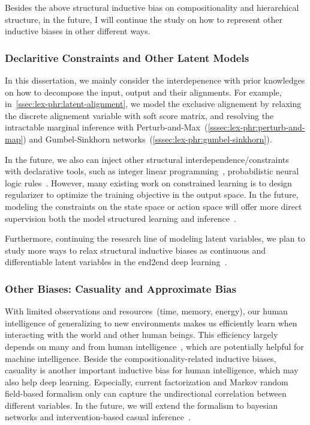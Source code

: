 Besides the above structural inductive bias on compositionality and
hierarchical structure, in the future, I will continue the study on how
to represent other inductive biases in other different ways.

\subsubsection{Declaritive Constraints and Other Latent Models}
\label{sssec:future:constraints}
In this dissertation, we mainly consider the interdepenence with prior
knowledges on how to decompose the input, output and their alignments.
For example, in~\autoref{ssec:lex-phr:latent-alignment}, we model the
exclusive alignement by relaxing the discrete alignement variable with
soft score matrix, and resolving the intractable marginal inference
with Perturb-and-Max~(\autoref{sssec:lex-phr:perturb-and-map}) and
Gumbel-Sinkhorn networks~(\autoref{sssec:lex-phr:gumbel-sinkhorn}).

In the future, we also can inject other structural
interdependence/constraints with declarative tools, such as integer
linear programming~\citep{roth2007global}, probabilistic neural logic
rules~\citep{bach2017hinge,li2019augmenting,pacheco2021modeling,marra2019integrating}.
However, many existing work on constrained learning is to design
regularizer to optimize the training objective in the output space.
In the future, modeling the constraints on the state space or action
space will offer more direct supervision both the model structured learning and
inference~\cite{lu-etal-2022-neurologic}.

Furthermore, continuing the research line of modeling latent
variables, we plan to study more ways to relax structural inductive
biases as continuous and differentiable latent variables in the
end2end deep learning~\citep{yin2018structvae, corro2019learning}.

\subsubsection{Other Biases: Casuality and Approximate Bias}
\label{sssec:future:approx-biases}
With limited observations and resources~(time, memory, energy), our
human intelligence of generalizing to new environments makes us
efficiently learn when interacting with the world and other human
beings. This efficiency largely depends on many 
and  from human
intelligence~\cite{Gershman2021WhatMU}, which are potentially helpful
for machine intelligence. Beside the compositionality-related
inductive biases, casuality is another important inductive bias for
human intelligence, which may also help deep learning. Especially,
current factorization and Markov random field-based formalism only can
capture the undirectional correlation between different variables. In
the future, we will extend the formalism to bayesian networks and
intervention-based casual
inference~\citep{pearl2010causal,glymour2016causal}.


